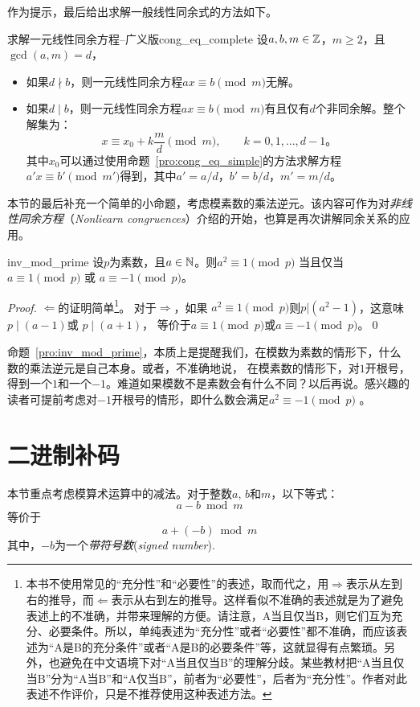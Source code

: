作为提示，最后给出求解一般线性同余式的方法如下。
\begin{proposition}{求解一元线性同余方程--广义版}{cong_eq_complete}
	设$a, b, m \in {\mathbb Z}$，$m \ge 2$，且$\gcd(a,m)=d$，
  \begin{itemize}
    \item 如果$d \nmid b$，则一元线性同余方程$ax \equiv b \pmod m$无解。
    \item 如果$d \mid b$，则一元线性同余方程$ax \equiv b \pmod m$有且仅有$d$个非同余解。整个解集为：
    \[ x\equiv x_0 + k\frac{m}{d}\pmod m, \qquad k=0,1,\ldots,d-1 \text{。}\]
    其中$x_0$可以通过使用命题~\ref{pro:cong_eq_simple}的方法求解方程$a'x \equiv b' \pmod{m'}$得到，其中$a' = a / d$，$b' = b / d$，$m' = m / d$。
  \end{itemize}
\end{proposition}

本节的最后补充一个简单的小命题，考虑模素数的乘法逆元。该内容可作为对\emph{非线性同余方程}（\emph{Nonliearn congruences}）介绍的开始，也算是再次讲解同余关系的应用。
\begin{proposition}{}{inv_mod_prime}
设$p$为素数，且$a\in {\mathbb N}$。则$a^2 \equiv 1 \pmod{p}$ 当且仅当$a \equiv 1 \pmod{p}$ 或 $a \equiv -1 \pmod{p}$。
\end{proposition}

\begin{proof}
     $\Leftarrow$的证明简单\footnote{本书不使用常见的“充分性”和“必要性”的表述，取而代之，用$\Rightarrow$表示从左到右的推导，而$\Leftarrow$表示从右到左的推导。这样看似不准确的表述就是为了避免表述上的不准确，并带来理解的方便。请注意，A当且仅当B，则它们互为充分、必要条件。所以，单纯表述为“充分性”或者“必要性”都不准确，而应该表述为“A是B的充分条件”或者“A是B的必要条件”等，这就显得有点繁琐。另外，也避免在中文语境下对“A当且仅当B”的理解分歧。某些教材把“A当且仅当B”分为“A当B”和“A仅当B”，前者为“必要性”，后者为“充分性”。作者对此表述不作评价，只是不推荐使用这种表述方法。}。
	对于$\Rightarrow$，如果 $a^2 \equiv 1 \pmod{p}$则$p \vert (a^2  - 1)$，这意味$p \mid (a - 1)$或 $p \mid (a + 1)$，
等价于$a \equiv 1 \pmod{p}$或$a \equiv -1 \pmod{p}$。\qed
\end{proof}
命题~\ref{pro:inv_mod_prime}，本质上是提醒我们，在模数为素数的情形下，什么数的乘法逆元是自己本身。或者，不准确地说，
在模素数的情形下，对$1$开根号，得到一个$1$和一个$-1$。难道如果模数不是素数会有什么不同？以后再说。感兴趣的读者可提前考虑对$-1$开根号的情形，即什么数会满足$a^2 \equiv -1 \pmod{p}$ 。

\section{二进制补码}
\label{sec:two_comp}
本节重点考虑模算术运算中的减法。对于整数$a$, $b$和$m$，以下等式：
\[ a - b \bmod m\]
等价于
\[a + (-b) \bmod m\]
其中，$-b$为一个\emph{带符号数}(\emph{signed number}). 

